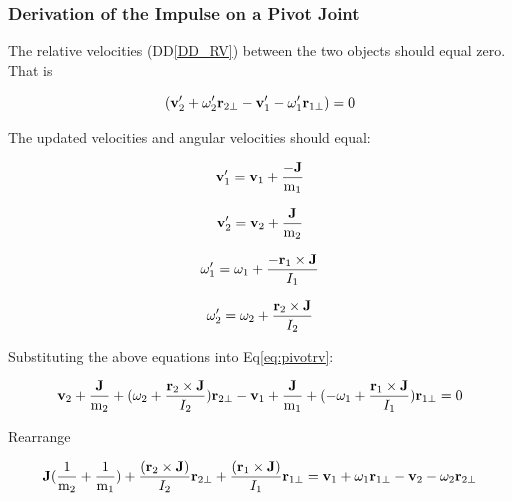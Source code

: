 \documentclass[12pt]{article}
\begin{document}
\subsubsection{Derivation of the Impulse on a Pivot Joint}
The relative velocities  (DD\ref{DD_RV})
between the two objects should equal zero. That is

\begin{equation}
(\textbf v'_\text{2} + \omega'_\text{2}\textbf r_\text{2$\perp$} - \textbf
v'_\text{1} - \omega'_\text{1}\textbf r_\text{1$\perp$}) = 0 \label{eq:pivotrv}
\end{equation}


\noindent
The updated velocities and angular velocities should equal:

\begin{equation*}
\bf v'_\text{1} =  v_\text{1} + \frac{-J}{ \textnormal m_\text{1}}
\end{equation*}

\begin{equation*}
\bf v'_\text{2} =  v_\text{2} + \frac{J}{ \textnormal m_\text{2}}
  \end{equation*}
  
\begin{equation*}
\omega'_\text{1} = \omega_\text{1} + \frac{-\textbf r_\text{1} \times \textbf
J}{I_\text{1}}
  \end{equation*}
  
\begin{equation*}
\omega'_\text{2} = \omega_\text{2} + \frac{\textbf r_\text{2} \times \textbf
J}{I_\text{2}}
  \end{equation*}

\noindent
Substituting the above equations into Eq\ref{eq:pivotrv}:

\begin{equation*}
\textbf v_\text{2} + \frac{\textbf J}{ \textnormal m_\text{2}} + 
( \omega_\text{2} + \frac{\textbf r_\text{2} \times \textbf
J}{I_\text{2}})\textbf r_\text{2$\perp$} -
\textbf v_\text{1} + \frac{\textbf J}{ \textnormal m_\text{1}} +  
( - \omega_\text{1} + \frac{\textbf r_\text{1} \times \textbf
J}{I_\text{1}})\textbf r_\text{1$\perp$}= 0
\end{equation*}

\noindent
Rearrange

\begin{equation*}
\textbf J(\frac{1}{ \textnormal m_\text{2}} + \frac{1}{ \textnormal
m_\text{1}})+ \frac{(\textbf r_\text{2} \times \textbf J)}{I_\text{2}}\textbf
r_\text{2$\perp$} + \frac{(\textbf r_\text{1} \times \textbf J) }{I_\text{1}}
\textbf r_\text{1$\perp$}
= \textbf v_\text{1} + \omega_\text{1} \textbf r_\text{1$\perp$} - \textbf
v_\text{2} - \omega_\text{2}\textbf r_\text{2$\perp$}
\end{equation*}
\end{document}
